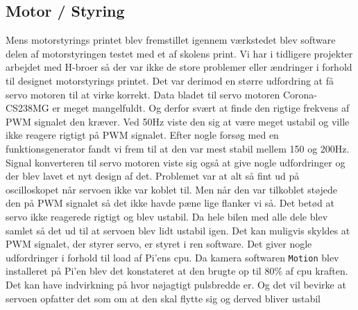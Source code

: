 \subsection{Motor / Styring} \label{sec:hwi_motor_styring}
Mens motorstyrings printet blev fremstillet igennem værkstedet blev software delen af motorstyringen testet med et af skolens print. Vi har i tidligere projekter arbejdet med H-broer så der var ikke de store problemer eller ændringer i forhold til designet motorstyrings printet.\newline
Det var derimod en større udfordring at få servo motoren til at virke korrekt.  
Data bladet til servo motoren Corona-CS238MG \cite{lib:Corona-CS238MG} er meget mangelfuldt. Og derfor svært at finde den rigtige frekvens af PWM signalet den kræver. 
Ved 50Hz viste den sig at være meget ustabil og ville ikke reagere rigtigt på PWM signalet. 
Efter nogle forsøg med en funktionsgenerator fandt vi frem til at den var mest stabil mellem 150 og 200Hz. 
Signal konverteren til servo motoren viste sig også at give nogle udfordringer og der blev lavet et nyt design af det.
Problemet var at alt så fint ud på oscilloskopet når servoen ikke var koblet til. 
Men når den var tilkoblet støjede den på PWM signalet så det ikke havde pæne lige flanker vi så. 
Det betød at servo ikke reagerede rigtigt og blev ustabil.
Da hele bilen med alle dele blev samlet så det ud til at servoen blev lidt ustabil igen. Det kan muligvis skyldes at PWM signalet, der styrer servo, er styret i ren software. 
Det giver nogle udfordringer i forhold til load af Pi'ens cpu. Da kamera softwaren \texttt{Motion} blev installeret på Pi'en blev det konstateret at den brugte op til 80\% af cpu kraften. Det kan have indvirkning på hvor nøjagtigt pulsbredde er. Og det vil bevirke at servoen opfatter det som om at den skal flytte sig og derved bliver ustabil